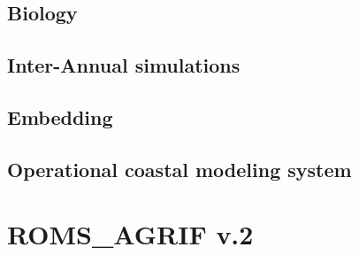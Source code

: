 \documentclass[11pt]{book}
\begin{document}
\section{Biology}


\section{Inter-Annual simulations}


\section{Embedding}


\newpage
\section{Operational coastal modeling system}



\chapter{ROMS\_AGRIF v.2}

\newpage



\newpage

\newpage

\newpage


\newpage
\begin{thebibliography}{}

\end{thebibliography}
\end{document}
